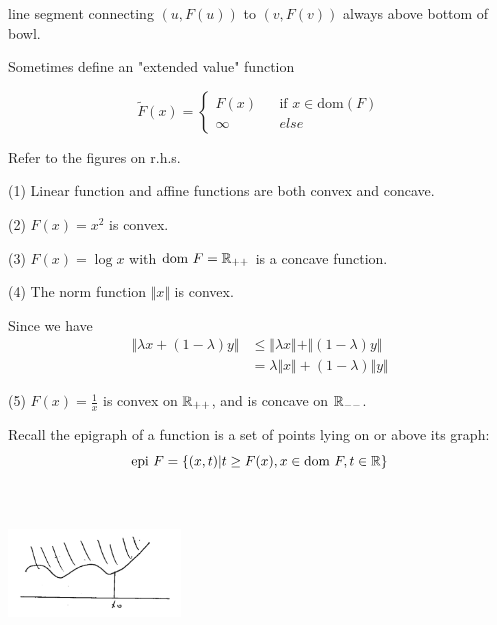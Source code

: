 line segment connecting $(u,F(u))$ to $(v, F(v))$ always above bottom of bowl.


Sometimes define an "extended value" function

$$ \tilde{F}(x)=\left\{
\begin{array}{rcl}
F(x)       &      & \text{if } x\in \text{dom}(F)\\
\infty   &      & else
\end{array} \right. 
$$

\begin{example}

Refer to the figures on r.h.s.

	(1) Linear function and affine functions are both convex and concave.
	
	(2) $F(x)=x^2$ is convex.
	
	(3) $F(x) = \log x$ with $\text{dom}\ F = \mathbb{R}_{++}$ is a concave function.
	
	(4) The norm function $\Vert x\Vert$ is convex. 
	
	Since we have
	\begin{align*}
	\Vert \lambda x + (1-\lambda)y\Vert 
	&\leq \Vert \lambda x\Vert + \Vert(1-\lambda)y\Vert\\
	&=\lambda \Vert x \Vert + (1-\lambda)\Vert y \Vert
	\end{align*}
	
	(5) $F(x)=\frac{1}{x}$ is convex on $\mathbb{R}_{++}$, and is concave on $\mathbb{R}_{--}$.
	
\end{example}
	
\vspace{0.5cm}
\begin{definition}[Epigraph]
Recall the epigraph of a function is a set of points lying on or above its graph:
\begin{equation*}
\text{epi}\ F = \{(x,t)|t\geq F(x), x\in \text{dom}\ F, t\in\mathbb{R} \}
\end{equation*}
\end{definition}

\begin{marginfigure}
	\centering
	\includegraphics[width=1.8in,height=1.8in]{figures/ch08/figure1030_11.png}
\end{marginfigure}

